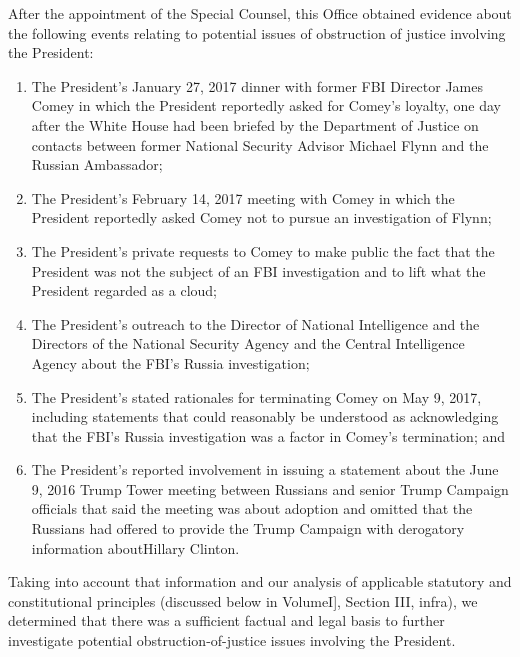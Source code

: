 After the appointment of the Special Counsel, this Office obtained evidence about the following events relating to potential issues of obstruction of justice involving the President:

\begin{enumerate}
    \item The President’s January 27, 2017 dinner with former FBI Director James Comey in which the President reportedly asked for Comey’s loyalty, one day after the White House had been briefed by the Department of Justice on contacts between former National Security Advisor Michael Flynn and the Russian Ambassador; 

    \item The President’s February 14, 2017 meeting with Comey in which the President reportedly asked Comey not to pursue an investigation of Flynn;

    \item The President’s private requests to Comey to make public the fact that the President was not the subject of an FBI investigation and to lift what the President regarded as a cloud;

    \item The President’s outreach to the Director of National Intelligence and the Directors of the National Security Agency and the Central Intelligence Agency about the FBI’s Russia investigation;

    \item The President’s stated rationales for terminating Comey on May 9, 2017, including statements that could reasonably be understood as acknowledging that the FBI’s Russia investigation was a factor in Comey’s termination; and

    \item The President’s reported involvement in issuing a statement about the June 9, 2016 Trump Tower meeting between Russians and senior Trump Campaign officials that said the meeting was about adoption and omitted that the Russians had offered to provide the Trump Campaign with derogatory information aboutHillary Clinton.
\end{enumerate}

Taking into account that information and our analysis of applicable statutory and constitutional principles (discussed below in VolumeI], Section III, infra), we determined that there was a sufficient factual and legal basis to further investigate potential obstruction-of-justice issues involving the President.

